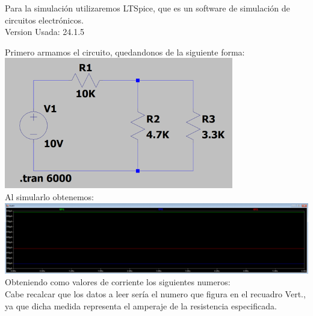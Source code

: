 \documentclass[a4paper,12pt]{article}
\begin{document}
Para la simulación utilizaremos LTSpice, que es un software de simulación de circuitos electrónicos.
\\
Version Usada: 24.1.5

\vspace{0.5cm}
Primero armamos el circuito, quedandonos de la siguiente forma:\\[0.5cm]

\includegraphics[width=10cm]{imagenes/cirbuitoltspice.png}\\[1.5cm]

Al simularlo obtenemos:\\

\includegraphics[width=15cm]{imagenes/simulacionresultado.png}\\[1.5cm]

Obteniendo como valores de corriente los siguientes numeros:\\

Cabe recalcar que los datos a leer sería el numero que figura en el recuadro Vert., ya que dicha medida representa el amperaje de la resistencia especificada.
\end{document}
